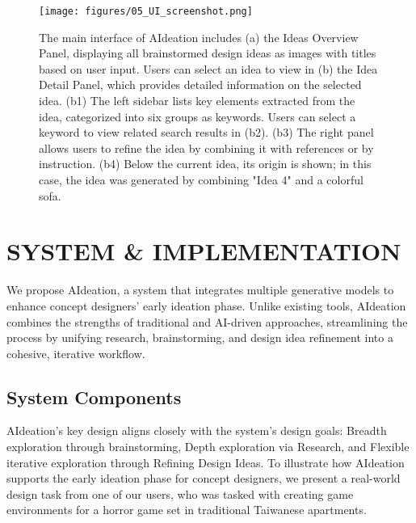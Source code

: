 \begin{figure*}[htbp]  
    \centering
    \texttt{[image: figures/05\_UI\_screenshot.png]} %
    \caption{The main interface of AIdeation includes (a) the Ideas Overview Panel, displaying all brainstormed design ideas as images with titles based on user input. Users can select an idea to view in (b) the Idea Detail Panel, which provides detailed information on the selected idea. (b1) The left sidebar lists key elements extracted from the idea, categorized into six groups as keywords. Users can select a keyword to view related search results in (b2). (b3) The right panel allows users to refine the idea by combining it with references or by instruction. (b4) Below the current idea, its origin is shown; in this case, the idea was generated by combining "Idea 4" and a colorful sofa.}
    \label{fig:ui}
\end{figure*}

\section{SYSTEM \& IMPLEMENTATION}
We propose AIdeation, a system that integrates multiple generative models to enhance concept designers' early ideation phase. Unlike existing tools, AIdeation combines the strengths of traditional and AI-driven approaches, streamlining the process by unifying research, brainstorming, and design idea refinement into a cohesive, iterative workflow.

\subsection{System Components}
AIdeation's key design aligns closely with the system’s design goals: Breadth exploration through brainstorming, Depth exploration via Research, and Flexible iterative exploration through Refining Design Ideas. To illustrate how AIdeation supports the early ideation phase for concept designers, we present a real-world design task from one of our users, who was tasked with creating game environments for a horror game set in traditional Taiwanese apartments.

